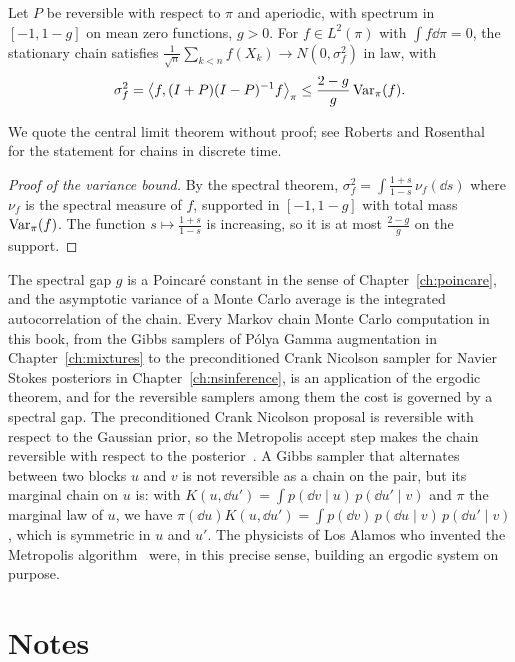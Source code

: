 \begin{theorem}
\label{thm:kipnis_varadhan}
Let $P$ be reversible with respect to $\pi$ and aperiodic, with spectrum in $[-1,1-g]$ on mean zero functions, $g>0$. For $f\in L^2(\pi)$ with $\int f\dd\pi = 0$, the stationary chain satisfies $\frac{1}{\sqrt n}\sum_{k<n}f(X_k)\to N(0,\sigma_f^2)$ in law, with
\[
\sigma_f^2 = \big\langle f,(I+P)(I-P)^{-1}f\big\rangle_\pi\leq\frac{2-g}{g}\,\mathrm{Var}_\pi(f).
\]
\end{theorem}

We quote the central limit theorem without proof; see Roberts and Rosenthal~\cite{robertsrosenthal2004} for the statement for chains in discrete time.

\begin{proof}[Proof of the variance bound]
By the spectral theorem, $\sigma_f^2 = \int\frac{1+s}{1-s}\,\nu_f(\dd s)$ where $\nu_f$ is the spectral measure of $f$, supported in $[-1,1-g]$ with total mass $\mathrm{Var}_\pi(f)$. The function $s\mapsto\frac{1+s}{1-s}$ is increasing, so it is at most $\frac{2-g}{g}$ on the support.
\end{proof}

The spectral gap $g$ is a Poincar\'e constant in the sense of Chapter~\ref{ch:poincare}, and the asymptotic variance of a Monte Carlo average is the integrated autocorrelation of the chain. Every Markov chain Monte Carlo computation in this book, from the Gibbs samplers of P\'olya Gamma augmentation in Chapter~\ref{ch:mixtures} to the preconditioned Crank Nicolson sampler for Navier Stokes posteriors in Chapter~\ref{ch:nsinference}, is an application of the ergodic theorem, and for the reversible samplers among them the cost is governed by a spectral gap. The preconditioned Crank Nicolson proposal is reversible with respect to the Gaussian prior, so the Metropolis accept step makes the chain reversible with respect to the posterior~\cite{cotter2013}. A Gibbs sampler that alternates between two blocks $u$ and $v$ is not reversible as a chain on the pair, but its marginal chain on $u$ is: with $K(u,\dd u') = \int p(\dd v\mid u)\,p(\dd u'\mid v)$ and $\pi$ the marginal law of $u$, we have $\pi(\dd u)K(u,\dd u') = \int p(\dd v)\,p(\dd u\mid v)\,p(\dd u'\mid v)$, which is symmetric in $u$ and $u'$. The physicists of Los Alamos who invented the Metropolis algorithm~\cite{metropolis1953} were, in this precise sense, building an ergodic system on purpose.

\section*{Notes}

